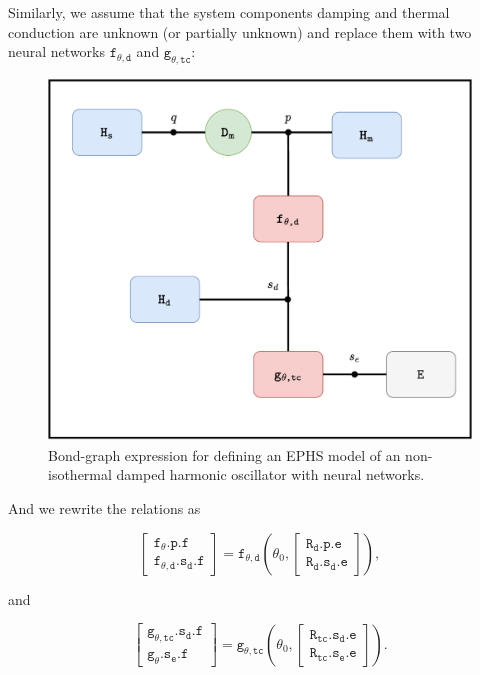 \documentclass[
	parskip, 			   %
	twoside, 			   %
	DIV=14, 			   %
	BCOR=15.0mm, 		   %
	headsepline, 		   %
	open=right, 		   %
	captions=tableheading, %
	bibliography=totoc,    %
	numbers=noenddot       %
]{scrreprt}
\begin{document}
Similarly, we assume that the system components damping and thermal conduction are unknown (or partially unknown) and replace them with two neural networks $\mathtt{f_{\theta, d}}$ and $\mathtt{g_{\theta, tc}}$:

\begin{figure}[h!]
    \centering
    \includegraphics[scale=0.6]{figures/bondgraph_ndho_exergetic_NN.pdf}
    \caption{Bond-graph expression for defining an EPHS model of an non-isothermal damped harmonic oscillator with neural networks.}
    \label{fig:bondgraph_ndho_exergetic_NN}
\end{figure}

And we rewrite the relations as

\begin{equation}
    \label{eq:resistive_structure_damping_interconnection_NN_ndho}
    \left[\begin{array}{l}\mathtt{f_{\theta}.p.f} \\ \mathtt{f_{\theta, d}.s_{d}.f}\end{array}\right]=\mathtt{f_{\theta,d}} \left(\theta_0, 
    \left[\begin{array}{l}\mathtt{R_{d}.p.e} \\ \mathtt{R_{d}.s_{d}.e}\end{array}\right] \right),
\end{equation}

and

\begin{equation}
    \label{eq:resistive_structure_thermal_conduction_interconnection_NN_ndho}
    \left[\begin{array}{l}\mathtt{g_{\theta, tc}.s_{d}.f} \\ \mathtt{g_{\theta}.s_{e}.f}\end{array}\right]=\mathtt{g_{\theta,tc}} \left(\theta_0, 
    \left[\begin{array}{l} \mathtt{R_{tc}.s_{d}.e} \\ \mathtt{R_{tc}.s_{e}.e}\end{array}\right] \right).
\end{equation}
\end{document}
